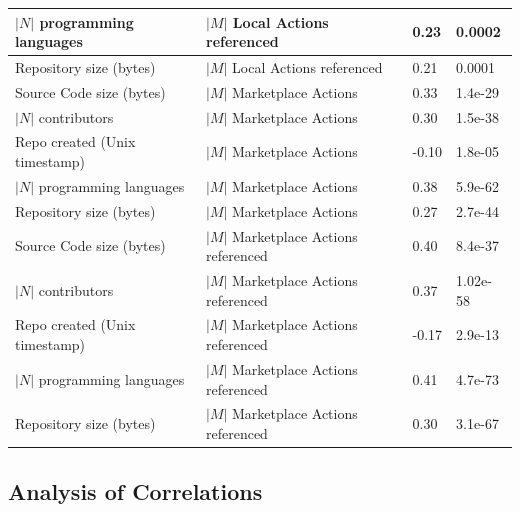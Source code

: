 \documentclass[conference]{IEEEtran}
\begin{document}
\begin{table}[H]
\begin{tabular}{|p{2.5cm}|p{3cm}|p{0.75cm}|p{1cm}|}
            \hline
            $|N|$ programming \newline languages & $|M|$ Local Actions \newline referenced & 0.23 & 0.0002 \\
            \hline
            Repository size \newline (bytes) & $|M|$ Local Actions \newline referenced & 0.21 & 0.0001 \\
            \hline
            Source Code size \newline (bytes) & $|M|$ Marketplace Actions & 0.33 & 1.4e-29 \\
            \hline
            $|N|$ contributors & $|M|$ Marketplace Actions & 0.30 & 1.5e-38 \\
            \hline
            Repo created \newline (Unix timestamp) & $|M|$ Marketplace Actions & -0.10 & 1.8e-05 \\
            \hline
            $|N|$ programming \newline languages & $|M|$ Marketplace Actions & 0.38 & 5.9e-62 \\
            \hline
            Repository size \newline (bytes) & $|M|$ Marketplace Actions & 0.27 & 2.7e-44 \\
            \hline
            Source Code size \newline (bytes) & $|M|$ Marketplace Actions referenced & 0.40 & 8.4e-37 \\
            \hline
            $|N|$ contributors & $|M|$ Marketplace Actions referenced & 0.37 & 1.02e-58  \\
            \hline
            Repo created \newline (Unix timestamp) & $|M|$ Marketplace Actions referenced & -0.17 & 2.9e-13 \\
            \hline
            $|N|$ programming \newline languages & $|M|$ Marketplace Actions referenced & 0.41 & 4.7e-73 \\
            \hline
            Repository size \newline (bytes) & $|M|$ Marketplace Actions referenced & 0.30 & 3.1e-67 \\
            \hline
        \end{tabular}
      \end{table}
      
      \subsection{Analysis of Correlations}
      
\end{document}
